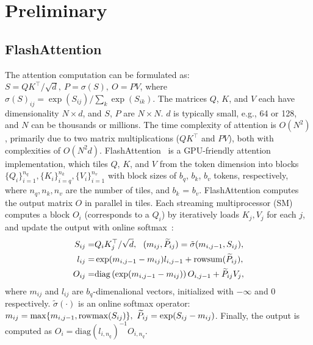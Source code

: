 \section{Preliminary} \label{sec:preliminary}
\subsection{FlashAttention} \label{sec:flashattn}
The attention computation can be formulated as: $S = Q K^\top/\sqrt{d},~P = \sigma(S),~O = P V$, where $\sigma(S)_{ij} = \exp(S_{ij})/\sum_{k} \exp(S_{ik})$.
The matrices $Q$, $K$, and $V$ each have dimensionality $N \times d$, and $S$, $P$ are $N \times N$. $d$ is typically small, e.g., 64 or 128, and $N$ can be thousands or millions. The time complexity of attention is \(O(N^2)\), primarily due to two matrix multiplications (\(QK^\top\) and \(PV\)), both with complexities of \(O(N^2d)\).
FlashAttention~\cite{dao2023flashattention} is a GPU-friendly attention implementation, which tiles $Q$, $K$, and $V$ from the token dimension into blocks $\{Q_i\}_{i=1}^{n_q}, \{K_i\}_{i=q}^{n_k}, \{V_i\}_{i=1}^{n_v}$ with block sizes of $b_q$, $b_{k}$, $b_{v}$ tokens, respectively, where $n_q, n_k, n_v$ are the number of tiles, and $b_{k}$ = $b_{v}$. 
FlashAttention computes the output matrix $O$ in parallel in tiles. Each streaming multiprocessor (SM) computes a block $O_i$ (corresponds to a $Q_i$) by iteratively loads $K_j, V_j$ for each $j$, and update the output  with online softmax~\cite{milakov2018online}: 
\begin{align}
 S_{ij} =& Q_i K_j^\top / \sqrt{d},~~(m_{ij}, \widetilde P_{ij}) = \tilde\sigma(m_{i,j-1}, S_{ij}),\label{eqn:online-softmax} \\
 l_{ij} =& \exp(m_{i,j-1}-m_{ij}) l_{i,j-1} + \mathrm{rowsum}(\widetilde P_{ij}),\notag \\
 O_{ij}=& \mathrm{diag}\left(\exp(m_{i,j-1}-m_{ij})\right) O_{i,j-1} + \widetilde P_{ij} V_j  \notag, 
\end{align}
where $m_{ij}$ and $l_{ij}$ are $b_q$-dimenalional vectors, initialized with $-\infty$ and $0$ respectively. $\tilde \sigma(\cdot)$ is an online softmax operator: $m_{ij} = \max\{m_{i,j-1}, \mathrm{rowmax}(S_{ij})\},~\widetilde P_{ij}=\exp(S_{ij}-m_{ij})$.
Finally, the output is computed as $O_i = \mathrm{diag}(l_{i,n_q})^{-1} O_{i,n_q}$.




